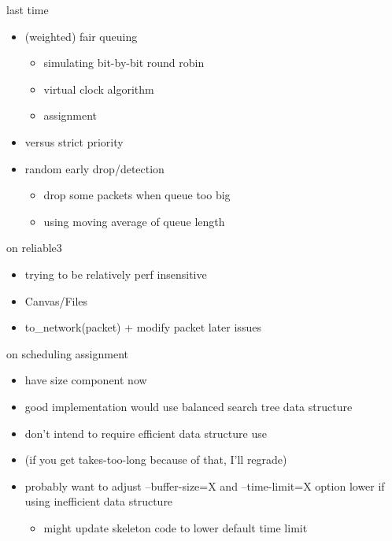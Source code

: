 \date{}
\title{}
\date{}

\begin{frame}
    \titlepage
\end{frame}

\begin{frame}{last time}
    \begin{itemize}
    \item (weighted) fair queuing
        \begin{itemize}
        \item simulating bit-by-bit round robin
        \item virtual clock algorithm
        \item assignment
        \end{itemize}
    \item versus strict priority
    \item random early drop/detection
        \begin{itemize}
        \item drop some packets when queue too big
        \item using moving average of queue length
        \end{itemize}
    \end{itemize}
\end{frame}

\begin{frame}{on reliable3}
    \begin{itemize}
    \item trying to be relatively perf insensitive
    \vspace{.5cm}
    \item Canvas/Files
    \vspace{.5cm}
    \item to\_network(packet) + modify packet later issues
    \end{itemize}
\end{frame}

\begin{frame}{on scheduling assignment}
    \begin{itemize}
    \item have size component now
    \vspace{.5cm}
    \item good implementation would use balanced search tree data structure
    \item don't intend to require efficient data structure use
    \item (if you get takes-too-long because of that, I'll regrade)
    \vspace{.5cm}
    \item probably want to adjust --buffer-size=X and --time-limit=X option lower if using inefficient data structure
        \begin{itemize}
        \item might update skeleton code to lower default time limit
        \end{itemize}
    \end{itemize}
\end{frame}

